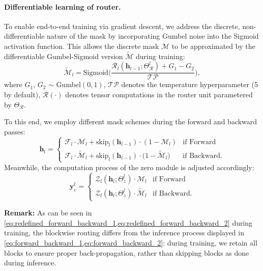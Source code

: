 \paragraph{Differentiable learning of router.}

To enable end-to-end training via gradient descent, we address the discrete, non-differentiable nature of the mask by incorporating Gumbel noise into the Sigmoid activation function. This allows the discrete mask $\mathcal{M}$ to be approximated by the differentiable Gumbel-Sigmoid version $\widetilde{\mathcal{M}}$ during training:
\begin{equation}    
    \widetilde{\mathcal{M}}_{l}=\mathrm{Sigmoid}\bigg(\frac{\mathcal{R}_{l}\left(\mathbf{h}_{l-1};\Theta_{\mathcal{R}}^{l}\right)+G_{1}-G_{2}}{\mathcal{TP}}\bigg),
\end{equation}
where $G_{1}$, $G_{2}$ $\sim$ Gumbel$(0, 1)$, $\mathcal{TP}$ denotes the temperature hyperparameter (5 by default), $\mathcal{R}\left(\cdot\right)$ denotes tensor computations in the router unit parametered by $\Theta_{\mathcal{R}}$.

To this end, we employ different mask schemes during the forward and backward passes:
\begin{equation}
\mathbf{h}_{l}=
\begin{cases}
    \mathcal{F}_{l}\cdot\mathcal{M}_{l}+\mathrm{skip}_{l}\left(\mathbf{h}_{l-1}\right)\cdot\left(1-\mathcal{M}_{l}\right)
    &\text{if Forward} \\
    \mathcal{F}_{l}\cdot\widetilde{\mathcal{M}}_{l}+\mathrm{skip}_{l}\left(\mathbf{h}_{l-1}\right)\cdot\big(1-\widetilde{\mathcal{M}}_{l}\big)
    &\text{if Backward}.
\end{cases}
\label{eq:redefined_forward_backward_1}
\end{equation}
Meanwhile, the computation process of the zero module is adjusted accordingly:
\begin{equation}
\mathbf{y}_{c}^{l}=
\begin{cases}
    \mathcal{Z}_{l}\left(\mathbf{h}_{l};\Theta_{z}^{l}\right)\cdot \mathcal{M}_{l}
    &\text{if Forward} \\
    \mathcal{Z}_{l}\left(\mathbf{h}_{l};\Theta_{z}^{l}\right)\cdot \widetilde{\mathcal{M}}_{l}
    &\text{if Backward}.
\end{cases}
\label{eq:redefined_forward_backward_2}
\end{equation}

{\bf Remark:} As can be seen in \cref{eq:redefined_forward_backward_1,eq:redefined_forward_backward_2} during training, the blockwise routing differs from the inference process displayed in \cref{eq:forward_backward_1,eq:forward_backward_2}: during training, we retain all blocks to ensure proper back-propagation, rather than skipping blocks as done during inference. %

